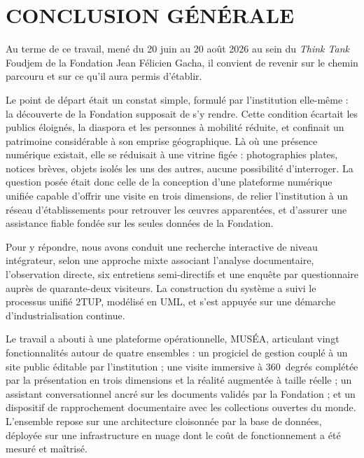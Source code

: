 \cleardoublepage
{}
\chapter*{CONCLUSION GÉNÉRALE}

Au terme de ce travail, mené du 20 juin au 20 août 2026 au sein du \emph{Think
Tank} Foudjem de la Fondation Jean Félicien Gacha, il convient de revenir sur le
chemin parcouru et sur ce qu'il aura permis d'établir.

Le point de départ était un constat simple, formulé par l'institution
elle-même : la découverte de la Fondation supposait de s'y rendre. Cette
condition écartait les publics éloignés, la diaspora et les personnes à mobilité
réduite, et confinait un patrimoine considérable à son emprise géographique. Là
où une présence numérique existait, elle se réduisait à une vitrine figée :
photographies plates, notices brèves, objets isolés les uns des autres, aucune
possibilité d'interroger. La question posée était donc celle de la conception
d'une plateforme numérique unifiée capable d'offrir une visite en trois
dimensions, de relier l'institution à un réseau d'établissements pour retrouver
les œuvres apparentées, et d'assurer une assistance fiable fondée sur les seules
données de la Fondation.

Pour y répondre, nous avons conduit une recherche interactive de niveau
intégrateur, selon une approche mixte associant l'analyse documentaire,
l'observation directe, six entretiens semi-directifs et une enquête par
questionnaire auprès de quarante-deux visiteurs. La construction du système a
suivi le processus unifié 2TUP, modélisé en UML, et s'est appuyée sur une
démarche d'industrialisation continue.

Le travail a abouti à une plateforme opérationnelle, MUSÉA, articulant vingt
fonctionnalités autour de quatre ensembles : un progiciel de gestion couplé à un
site public éditable par l'institution ; une visite immersive à 360~degrés
complétée par la présentation en trois dimensions et la réalité augmentée à
taille réelle ; un assistant conversationnel ancré sur les documents validés par
la Fondation ; et un dispositif de rapprochement documentaire avec les
collections ouvertes du monde. L'ensemble repose sur une architecture cloisonnée
par la base de données, déployée sur une infrastructure en nuage dont le coût de
fonctionnement a été mesuré et maîtrisé.

